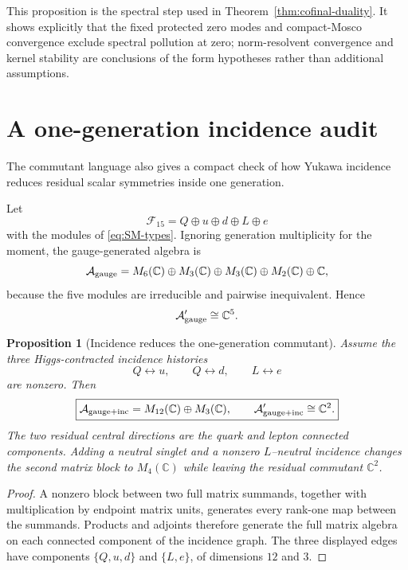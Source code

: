 \documentclass[11pt]{article}
\newtheorem{proposition}[theorem]{Proposition}
\theoremstyle{definition}
\theoremstyle{remark}
\newcommand{\C}{\mathbb C}
\newcommand{\A}{\mathcal A}
\begin{document}
This proposition is the spectral step used in
Theorem~\ref{thm:cofinal-duality}.  It shows explicitly that the fixed protected
zero modes and compact-Mosco convergence exclude spectral pollution at zero;
norm-resolvent convergence and kernel stability are conclusions of the form
hypotheses rather than additional assumptions.

\section{A one-generation incidence audit}
\label{app:one-generation}

The commutant language also gives a compact check of how Yukawa incidence
reduces residual scalar symmetries inside one generation.

Let
\[
\mathcal F_{15}=Q\oplus u\oplus d\oplus L\oplus e
\]
with the modules of \eqref{eq:SM-types}.  Ignoring generation multiplicity for
the moment, the gauge-generated algebra is
\begin{equation}
\A_{\rm gauge}
=
M_6(\C)\oplus M_3(\C)\oplus M_3(\C)\oplus M_2(\C)\oplus\C,
\label{eq:one-gen-gauge-algebra}
\end{equation}
because the five modules are irreducible and pairwise inequivalent.  Hence
\[
\A_{\rm gauge}'\cong\C^5.
\]

\begin{proposition}[Incidence reduces the one-generation commutant]
\label{prop:one-gen-incidence}
Assume the three Higgs-contracted incidence histories
\[
Q\leftrightarrow u,\qquad
Q\leftrightarrow d,\qquad
L\leftrightarrow e
\]
are nonzero.  Then
\[
\boxed{
\A_{\rm gauge+inc}
=
M_{12}(\C)\oplus M_3(\C),
\qquad
\A_{\rm gauge+inc}'\cong\C^2.}
\]
The two residual central directions are the quark and lepton connected
components.  Adding a neutral singlet and a nonzero $L$--neutral incidence
changes the second matrix block to $M_4(\C)$ while leaving the residual
commutant $\C^2$.
\end{proposition}

\begin{proof}
A nonzero block between two full matrix summands, together with multiplication
by endpoint matrix units, generates every rank-one map between the summands.
Products and adjoints therefore generate the full matrix algebra on each
connected component of the incidence graph.  The three displayed edges have
components $\{Q,u,d\}$ and $\{L,e\}$, of dimensions $12$ and $3$.
\end{proof}
\end{document}
